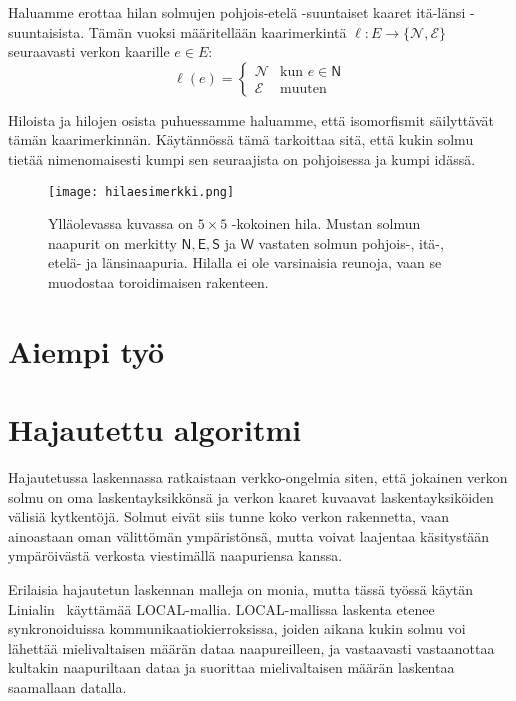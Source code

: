 \documentclass[12pt,finnish]{tktltiki2}
\theoremstyle{definition}
\theoremstyle{remark}
\begin{document}
Haluamme erottaa hilan solmujen pohjois-etelä -suuntaiset kaaret itä-länsi -suuntaisista. Tämän vuoksi määritellään kaarimerkintä $\ell: E \rightarrow \{\mathcal{N}, \mathcal{E}\}$ seuraavasti verkon kaarille $e \in E$:
\[ \ell(e) = 
  \begin{cases}
   \mathcal{N} & \text{kun } e \in \mathsf{N} \\
   \mathcal{E} & \text{muuten}
  \end{cases}
\]

Hiloista ja hilojen osista puhuessamme haluamme, että isomorfismit säilyttävät tämän kaarimerkinnän. Käytännössä tämä tarkoittaa sitä, että kukin solmu tietää nimenomaisesti kumpi sen seuraajista on pohjoisessa ja kumpi idässä.

\begin{figure}
  \centering
  \texttt{[image: hilaesimerkki.png]}
  \caption{Ylläolevassa kuvassa on $5 \times 5$ -kokoinen hila. Mustan solmun naapurit on merkitty $\mathsf{N}, \mathsf{E}, \mathsf{S}$ ja $\mathsf{W}$ vastaten solmun pohjois-, itä-, etelä- ja länsinaapuria. Hilalla ei ole varsinaisia reunoja, vaan se muodostaa toroidimaisen rakenteen. }
\end{figure}


\section{Aiempi työ}

\section{Hajautettu algoritmi}

Hajautetussa laskennassa ratkaistaan verkko-ongelmia siten, että jokainen verkon solmu on oma laskentayksikkönsä ja verkon kaaret kuvaavat laskentayksiköiden välisiä kytkentöjä. Solmut eivät siis tunne koko verkon rakennetta, vaan ainoastaan oman välittömän ympäristönsä, mutta voivat laajentaa käsitystään ympäröivästä verkosta viestimällä naapuriensa kanssa.

Erilaisia hajautetun laskennan malleja on monia, mutta tässä työssä käytän Linialin~\cite{linial92} käyttämää LOCAL-mallia. LOCAL-mallissa laskenta etenee synkronoiduissa kommunikaatiokierroksissa, joiden aikana kukin solmu voi lähettää mielivaltaisen määrän dataa naapureilleen, ja vastaavasti vastaanottaa kultakin naapuriltaan dataa ja suorittaa mielivaltaisen määrän laskentaa saamallaan datalla.
\end{document}
